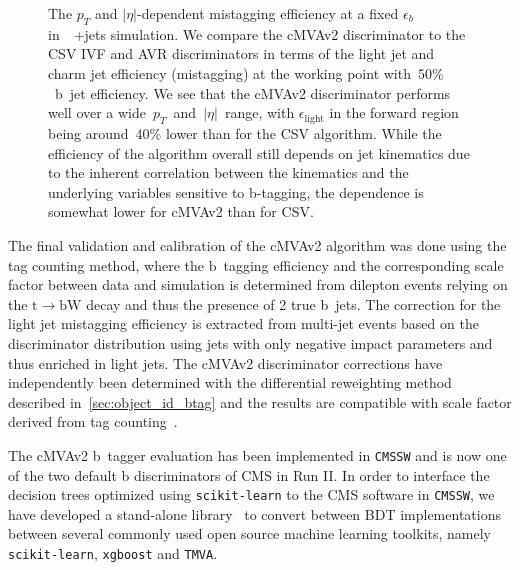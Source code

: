 \begin{figure}
\begin{centering}
\caption{The $p_T$ and $|\eta|$-dependent mistagging efficiency at a fixed $\epsilon_{b}$ in~\ttbar~+jets simulation. We compare the cMVAv2 discriminator to the CSV IVF and AVR discriminators in terms of the light jet and charm jet efficiency (mistagging) at the working point with~$50\%$~b~jet efficiency. We see that the cMVAv2 discriminator performs well over a wide~$p_T$~and~$|\eta|$~range, with $\epsilon_{\mathrm{light}}$ in the forward region being around~$40\%$ lower than for the CSV algorithm. While the efficiency of the algorithm overall still depends on jet kinematics due to the inherent correlation between the kinematics and the underlying variables sensitive to b-tagging, the dependence is somewhat lower for cMVAv2 than for CSV.}
\label{fig:btag_kinematics}
\end{centering}
\end{figure}

The final validation and calibration of the cMVAv2 algorithm was done using the tag counting method, where the b~tagging efficiency and the corresponding scale factor between data and simulation is determined from dilepton events relying on the $\mathrm{t} \rightarrow \mathrm{b} \mathrm{W}$ decay and thus the presence of 2 true b~jets. The correction for the light jet mistagging efficiency is extracted from multi-jet events based on the discriminator distribution using jets with only negative impact parameters and thus enriched in light jets. The cMVAv2 discriminator corrections have independently been determined with the differential reweighting method described in~\cref{sec:object_id_btag} and the results are compatible with scale factor derived from tag counting~\cite{CMS-PAS-BTV-15-001}. 

The cMVAv2 b~tagger evaluation has been implemented in \texttt{CMSSW} and is now one of the two default b discriminators of CMS in Run II. In order to interface the decision trees optimized using \texttt{scikit-learn} to the CMS software in \texttt{CMSSW}, we have developed a stand-alone library~\cite{mlglue} to convert between BDT implementations between several commonly used open source machine learning toolkits, namely \texttt{scikit-learn}, \texttt{xgboost} and \texttt{TMVA}.
